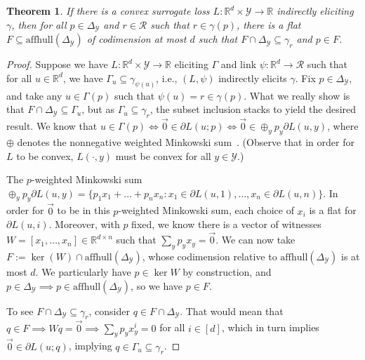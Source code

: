 \documentclass{article}
\newcommand{\Comments}{1}
\newcommand{\mynote}[2]{\ifnum\Comments=1\textcolor{#1}{#2}\fi}
\newcommand{\jessie}[1]{\mynote{purple}{[JF: #1]}}
\newcommand{\reals}{\mathbb{R}}
\newcommand{\simplex}{\Delta_\Y}
\newcommand{\affhull}{\mathrm{affhull}}
\newcommand{\R}{\mathcal{R}}
\newcommand{\Y}{\mathcal{Y}}
\newtheorem{theorem}{Theorem}
\begin{document}
\begin{theorem}\label{thm:cvx-flats}
%	
	If there is a convex surrogate loss $L : \reals^d \times\Y \to \reals$ indirectly eliciting $\gamma$, then for all $p \in \simplex$ and $r \in \R$ such that $r \in \gamma(p)$, there is a flat $F \subseteq \affhull(\simplex)$ of codimension at most $d$ such that $F \cap \simplex \subseteq \gamma_r$ and $p \in F$.
\end{theorem}
\begin{proof}
%	
	Suppose we have $L:\reals^d \times \Y \to \reals$ eliciting $\Gamma$ and link $\psi : \reals^d \to \R$ such that for all $u \in \reals^d$, we have $\Gamma_u \subseteq \gamma_{\psi(u)}$, i.e., $(L, \psi)$ indirectly elicits $\gamma$.
	Fix $p \in \simplex$, and take any $u \in \Gamma(p)$ such that $\psi(u) = r \in \gamma(p)$.
	What we really show is that $F \cap \simplex \subseteq \Gamma_u$, but as $\Gamma_u \subseteq \gamma_r$, the subset inclusion stacks to yield the desired result.
	We know that $u \in \Gamma(p) \iff \vec 0 \in \partial L(u; p) \iff \vec 0 \in \oplus_y p_y \partial L(u,y)$, where $\oplus$ denotes the nonnegative weighted Minkowski sum~\cite[Theorem 4.1.1]{hiriart2012fundamentals}.  (Observe that in order for $L$ to be convex, $L(\cdot, y)$ must be convex for all $y \in \Y$.) 
	
	The $p$-weighted Minkowski sum $\oplus_y p_y \partial L(u,y) = \{p_1 x_1 + \ldots + p_n x_n : x_1 \in \partial L(u,1), \ldots, x_n \in \partial L(u,n) \}$.
	In order for $\vec 0$ to be in this $p$-weighted Minkowski sum, each choice of $x_i$ is a flat for $\partial L(u, i)$.
	Moreover, with $p$ fixed, we know there is a vector of witnesses $W = [x_1, \ldots, x_n] \in \reals^{d\times n}$ such that $\sum_y p_y x_y = \vec 0$.%
	We can now take $F := \ker(W) \cap \affhull(\simplex)$, whose codimension relative to $\affhull(\simplex)$ is at most $d$.
	We particularly have $p \in \ker W$ by construction, and $p \in \simplex \implies p \in \affhull(\simplex)$, so we have $p \in F$.

	To see $F \cap \simplex \subseteq \gamma_r$, consider $q \in F \cap \simplex$.
	That would mean that $q \in F \implies Wq = \vec 0 \implies \sum_y p_y x_y^i = 0$ for all $i \in [d]$, which in turn implies $\vec 0 \in \partial L(u;q)$, implying $q \in \Gamma_u \subseteq \gamma_{r}$.
\end{proof}
\end{document}
